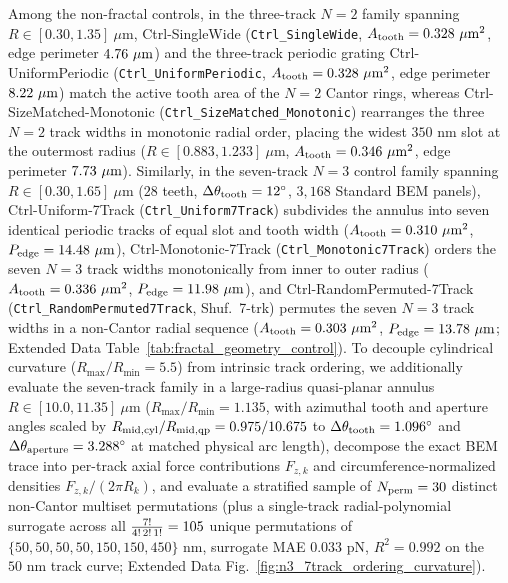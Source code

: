 \documentclass[pdflatex,sn-nature]{sn-jnl}
\DeclareRobustCommand{\roundzero}[1]{\fpeval{round(#1,0)}}
\DeclareRobustCommand{\roundtwo}[1]{\fpeval{round(#1,2)}}
\DeclareRobustCommand{\roundthree}[1]{\fpeval{round(#1,3)}}
\begin{document}
Among the non-fractal controls, in the three-track $N=2$ family spanning $R \in [0.30, 1.35]\ \mu\text{m}$, Ctrl-SingleWide (\texttt{Ctrl\_SingleWide}, $A_{\rm tooth} = \roundthree{\FractalCtrlSinglewideActiveToothAreaUmtwo}\ \mu\text{m}^2$, edge perimeter $\roundtwo{\FractalCtrlSinglewideEdgePerimeterUm}\ \mu\text{m}$) and the three-track periodic grating Ctrl-UniformPeriodic (\texttt{Ctrl\_UniformPeriodic}, $A_{\rm tooth} = \roundthree{\FractalCtrlUniformperiodicActiveToothAreaUmtwo}\ \mu\text{m}^2$, edge perimeter $\roundtwo{\FractalCtrlUniformperiodicEdgePerimeterUm}\ \mu\text{m}$) match the active tooth area of the $N=2$ Cantor rings, whereas Ctrl-SizeMatched-Monotonic (\texttt{Ctrl\_SizeMatched\_Monotonic}) rearranges the three $N=2$ track widths in monotonic radial order, placing the widest $350\text{ nm}$ slot at the outermost radius ($R \in [0.883, 1.233]\ \mu\text{m}$, $A_{\rm tooth} = \roundthree{\FractalCtrlSizematchedMonotonicActiveToothAreaUmtwo}\ \mu\text{m}^2$, edge perimeter $\roundtwo{\FractalCtrlSizematchedMonotonicEdgePerimeterUm}\ \mu\text{m}$). Similarly, in the seven-track $N=3$ control family spanning $R \in [0.30, 1.65]\ \mu\text{m}$ ($28$ teeth, $\Delta\theta_{\rm tooth} = 12^\circ$, $3{,}168$ Standard BEM panels), Ctrl-Uniform-7Track (\texttt{Ctrl\_Uniform7Track}) subdivides the annulus into seven identical periodic tracks of equal slot and tooth width ($A_{\rm tooth} = 0.310\ \mu\text{m}^2$, $P_{\rm edge} = 14.48\ \mu\text{m}$), Ctrl-Monotonic-7Track (\texttt{Ctrl\_Monotonic7Track}) orders the seven $N=3$ track widths monotonically from inner to outer radius ($A_{\rm tooth} = 0.336\ \mu\text{m}^2$, $P_{\rm edge} = 11.98\ \mu\text{m}$), and Ctrl-RandomPermuted-7Track (\texttt{Ctrl\_RandomPermuted7Track}, Shuf.\ 7-trk) permutes the seven $N=3$ track widths in a non-Cantor radial sequence ($A_{\rm tooth} = 0.303\ \mu\text{m}^2$, $P_{\rm edge} = 13.78\ \mu\text{m}$; Extended Data Table~\ref{tab:fractal_geometry_control}). To decouple cylindrical curvature ($R_{\max}/R_{\min} = 5.5$) from intrinsic track ordering, we additionally evaluate the seven-track family in a large-radius quasi-planar annulus $R \in [10.0, 11.35]\ \mu\text{m}$ ($R_{\max}/R_{\min} = 1.135$, with azimuthal tooth and aperture angles scaled by $R_{\rm mid,cyl}/R_{\rm mid,qp} = 0.975/10.675$ to $\Delta\theta_{\rm tooth} = 1.096^\circ$ and $\Delta\theta_{\rm aperture} = 3.288^\circ$ at matched physical arc length), decompose the exact BEM trace into per-track axial force contributions $F_{z,k}$ and circumference-normalized densities $F_{z,k}/(2\pi R_k)$, and evaluate a stratified sample of $N_{\rm perm} = \roundzero{\NthreePermNEvaluated}$ distinct non-Cantor multiset permutations (plus a single-track radial-polynomial surrogate across all $\frac{7!}{4!\,2!\,1!} = \roundzero{\NthreePermNUniqueMultiset}$ unique permutations of $\{50, 50, 50, 50, 150, 150, 450\}\text{ nm}$, surrogate MAE $0.033\text{ pN}$, $R^2 = 0.992$ on the $50\text{ nm}$ track curve; Extended Data Fig.~\ref{fig:n3_7track_ordering_curvature}).
\end{document}
